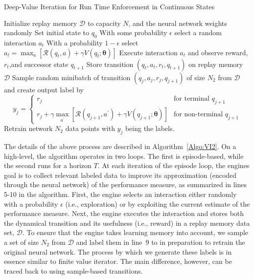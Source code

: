\begin{algorithm}[h!]
\caption{Deep-Value Iteration for Run Time Enforcement in Continuous States}
\label{Algo:VI2}
\begin{algorithmic}[1]
\STATE Initialize replay memory $\mathcal{D}$ to capacity $N$, and the neural network weights randomly 
\STATE Set initial state to $q_{0}$
\STATE With some probability $\epsilon$ select a random interaction $a_{t}$
\STATE With a probability $1 - \epsilon$ select $a_{t} = \max_{a} \left[\mathcal{R}(q_{t}, a) + \gamma V(q_{t};\bm{\theta})\right]$
\STATE Execute interaction $a_{t}$ and observe reward, $r_{t}$,and successor state $q_{t+1}$
\STATE Store transition $\left(q_{t}, a_{t}, r_{t}, q_{t+1}\right)$ on replay memory $\mathcal{D}$
\STATE Sample random minibatch of transition $\left(q_{j}, a_{j}, r_{j}, q_{j+1}\right)$ of size $N_{2}$ from $\mathcal{D}$ and create output label by 
\begin{displaymath}
   y_{j} = \left\{
     \begin{array}{lr}
       r_{j} & \text{for terminal $q_{j+1}$}\\
        r_{j} + \gamma \max_{a^{\prime}}\left[\mathcal{R}(q_{j+1}, a^{\prime}) + \gamma V(q_{j+1};\bm{\theta})\right]  & \text{for non-terminal $q_{j+1}$}
     \end{array}
   \right.
\end{displaymath} 
\ENDFOR
\STATE Retrain network $N_{2}$ data points with $y_{j}$ being the labels. 
\ENDFOR
\end{algorithmic}
\end{algorithm}
The details of the above process are described in Algorithm~\ref{Algo:VI2}. On a high-level, the algorithm operates in two loops. The first is episode-based, while the second runs for a horizon $T$. At each iteration of the episode loop, the engines goal is to collect relevant labeled data to improve its approximation (encoded through the neural network) of the performance measure, as summarized in lines 5-10 in the algorithm. First, the engine selects an interaction either randomly with a probability $\epsilon$ (i.e., exploration) or by exploiting the current estimate of the performance measure. Next, the engine executes the interaction and stores both the dynamical transition and its usefulness (i.e., reward) in a replay memory data set, $\mathcal{D}$. To ensure that the engine takes learning memory into account, we sample a set of size $N_{2}$ from $\mathcal{D}$ and label them in line~9 to in preparation to retrain the original neural network. The process by which we generate these labels is in essence similar to finite value iterator. The main difference, however, can be traced back to using sample-based transitions. 






